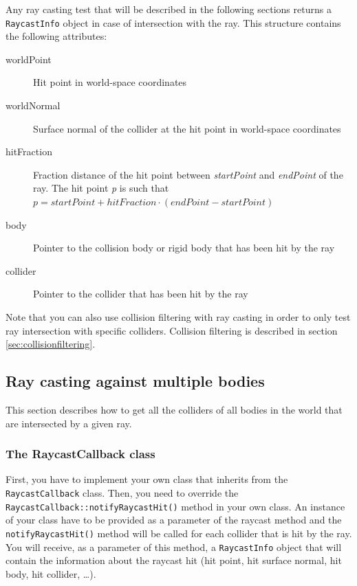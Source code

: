 \documentclass[a4paper,12pt]{article}
\begin{document}
    \vspace{0.6cm}

    Any ray casting test that will be described in the following sections returns a \texttt{RaycastInfo} object in case of intersection with the ray.
    This structure contains the following attributes: \\

    \begin{description}
         \item[worldPoint] Hit point in world-space coordinates
         \item[worldNormal] Surface normal of the collider at the hit point in world-space coordinates
         \item[hitFraction] Fraction distance of the hit point between \emph{startPoint}  and \emph{endPoint} of the ray. The hit point \emph{p} is such that
           $p = startPoint + hitFraction \cdot (endPoint - startPoint)$
         \item[body] Pointer to the collision body or rigid body that has been hit by the ray
         \item[collider] Pointer to the collider that has been hit by the ray
    \end{description}

    Note that you can also use collision filtering with ray casting in order to only test ray intersection with specific colliders.
    Collision filtering is described in section \ref{sec:collisionfiltering}.

    \subsection{Ray casting against multiple bodies}

    This section describes how to get all the colliders of all bodies in the world that are intersected by a given ray.

    \subsubsection{The RaycastCallback class}

    First, you have to implement your own class that inherits from the \texttt{RaycastCallback} class. Then, you need to override the
    \texttt{RaycastCallback::notifyRaycastHit()} method in your own class. An instance of your class have to be provided as a parameter
    of the raycast method and the \texttt{notifyRaycastHit()} method will be called for each collider that is hit by the ray. You will receive, as a parameter
    of this method, a \texttt{RaycastInfo} object that will contain the information about the raycast hit (hit point, hit surface normal, hit body, hit collider, \dots). \\
\end{document}
